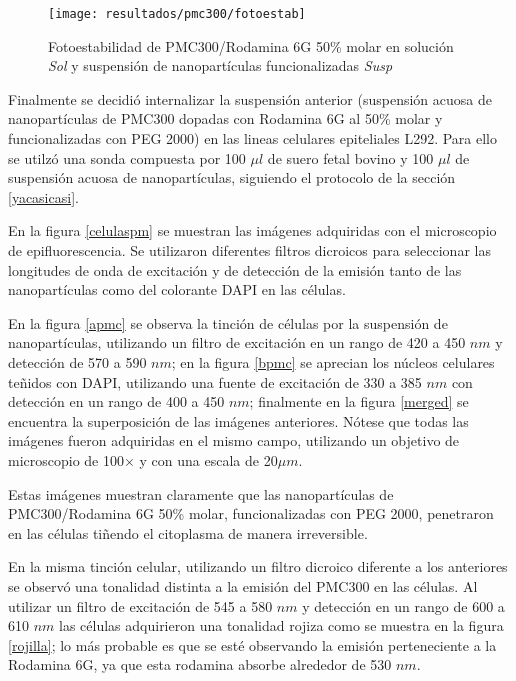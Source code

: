 \begin{figure}[H]
\centering
\texttt{[image: resultados/pmc300/fotoestab]}
\caption{Fotoestabilidad de PMC300/Rodamina 6G 50\% molar en soluci\'on \emph{Sol} y suspensi\'on de nanopart\'iculas funcionalizadas \emph{Susp}}\label{fotoestabilidad}
\end{figure}


Finalmente se decidi\'o internalizar la suspensi\'on anterior (suspensi\'on acuosa de nanopart\'iculas de PMC300 dopadas con Rodamina 6G al 50\% molar y funcionalizadas con PEG 2000) en las lineas celulares epiteliales L292. Para ello se utilz\'o una sonda compuesta por 100 $\mu l$ de suero fetal bovino y 100 $\mu l$ de suspensi\'on acuosa de nanopart\'iculas, siguiendo el protocolo de la secci\'on \ref{yacasicasi}.

En la figura \ref{celulaspm} se muestran las im\'agenes adquiridas con el microscopio de epifluorescencia. Se utilizaron diferentes filtros dicroicos para seleccionar las longitudes de onda de excitaci\'on y de detecci\'on de la emisi\'on tanto de las nanopart\'iculas como del colorante DAPI en las c\'elulas. 

En la figura \ref{apmc} se observa la tinci\'on de c\'elulas por la suspensi\'on de nanopart\'iculas, utilizando un filtro de excitaci\'on en un rango de 420 a 450 $nm$ y detecci\'on de 570 a 590 $nm$; en la figura \ref{bpmc} se aprecian los n\'ucleos celulares te\~{n}idos con DAPI, utilizando una fuente de excitaci\'on de 330 a 385 $nm$ con detecci\'on en un rango de 400 a 450 $nm$; finalmente en la figura \ref{merged} se encuentra la superposici\'on de las im\'agenes anteriores. N\'otese que todas las im\'agenes fueron adquiridas en el mismo campo, utilizando un objetivo de microscopio de 100$\times$ y con una escala de 20$\mu m$.

Estas im\'agenes muestran claramente que las nanopart\'iculas de PMC300/Rodamina 6G 50\% molar, funcionalizadas con PEG 2000, penetraron en las c\'elulas ti\~{n}endo el citoplasma de manera irreversible.  

En la misma tinci\'on celular, utilizando un filtro dicroico diferente a los anteriores se observ\'o una tonalidad distinta a la emisi\'on del PMC300 en las c\'elulas. Al utilizar un filtro de excitaci\'on de 545 a 580 $nm$ y detecci\'on en un rango de 600 a 610 $nm$ las c\'elulas adquirieron una tonalidad rojiza como se muestra en la figura \ref{rojilla}; lo m\'as probable es que se est\'e observando la emisi\'on perteneciente a la Rodamina 6G, ya que esta rodamina absorbe alrededor de 530 $nm$.

